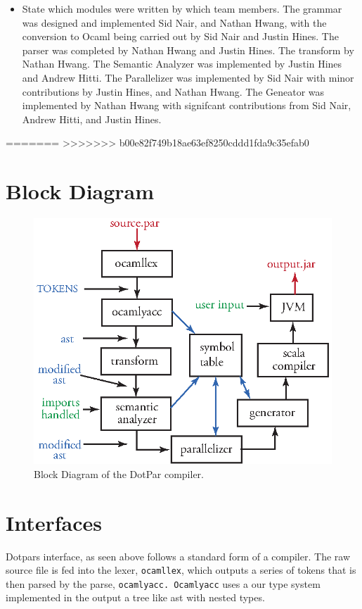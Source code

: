 \begin{itemize}
\item State which modules were written by which team members.
The grammar was designed and implemented Sid Nair, and Nathan Hwang, with the
conversion to Ocaml being carried out by Sid Nair and Justin Hines.  The parser was
completed by Nathan Hwang and Justin Hines.  The transform by Nathan Hwang.  The
Semantic Analyzer was implemented by Justin Hines and Andrew Hitti.  The Parallelizer was
implemented by Sid Nair with minor contributions by Justin Hines, and Nathan Hwang. 
The Geneator was implemented by Nathan Hwang with signifcant contributions from 
Sid Nair, Andrew Hitti, and Justin Hines.

\end{itemize}



=======
>>>>>>> b00e82f749b18ae63ef8250cddd1fda9c35efab0

\section{Block Diagram}
\begin{figure}[H]
\centering
\includegraphics[scale=1]{blockdiagram.eps} 
\caption{Block Diagram of the DotPar compiler.}
\end{figure}

\section{Interfaces}
Dotpars interface, as seen above follows a standard form of a
compiler. The raw source file is fed into the lexer, \verb=ocamllex=,
which outputs a series of tokens that is then parsed by the parse,
\verb=ocamlyacc. Ocamlyacc= uses a our type system implemented in the
output a tree like ast with nested types.

